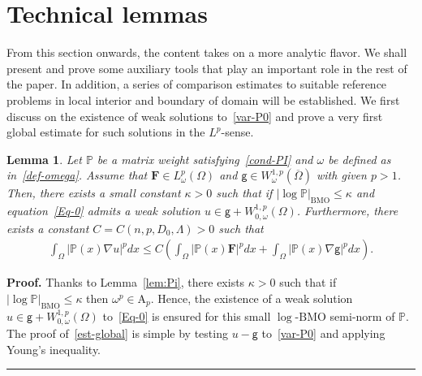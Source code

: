 \documentclass[a4paper, 11pt]{article}
\newtheorem{lemma}[theorem]{Lemma}
\newenvironment{proof}[1][Proof]{\textbf{#1.} }{\hfill\rule{0.5em}{0.5em}}
\begin{document}
\section{Technical lemmas}
\label{sec:lemma}

From this section onwards, the content takes on a more analytic flavor. We shall present and prove some auxiliary tools that play an important role in the rest of the paper. In addition, a series of comparison estimates to suitable reference problems in local interior and boundary of domain will be established. We first discuss on the existence of weak solutions to~\eqref{var-P0} and prove a very first global estimate for such solutions in the $L^p$-sense. 

\begin{lemma}\label{lem:global}
Let $\mathbb{P}$ be a matrix weight satisfying~\eqref{cond-PI} and $\omega$ be defined as in~\eqref{def-omega}. Assume that $\mathbf{F} \in L^{p}_{\omega}(\Omega)$ and $\mathsf{g} \in W^{1,p}_{\omega}(\overline{\Omega})$ with given $p>1$. Then, there exists a small constant $\kappa>0$ such that if $|\log \mathbb{P}|_{\mathrm{BMO}} \le \kappa$ and equation~\eqref{Eq-0} admits a weak solution $u \in \mathsf{g} + W^{1,p}_{0,\omega}(\Omega)$. Furthermore, there exists a constant $C = C(n,p,D_0,\Lambda)>0$ such that
\begin{align}\label{est-global}
\int_{\Omega} |\mathbb{P}(x) \nabla u|^p dx \le C \left( \int_{\Omega} |\mathbb{P}(x) \mathbf{F}|^p dx + \int_{\Omega} |\mathbb{P}(x) \nabla\mathsf{g}|^p dx\right).
\end{align}
\end{lemma}
\begin{proof}
Thanks to Lemma~\ref{lem:Pi}, there exists $\kappa>0$ such that if $|\log \mathbb{P}|_{\mathrm{BMO}} \le \kappa$ then $\omega^p \in \mathrm{A}_{p}$. Hence, the existence of a weak solution $u \in \mathsf{g} + W^{1,p}_{0,\omega}(\Omega)$ to~\eqref{Eq-0} is ensured for this small $\log$-$\mathrm{BMO}$ semi-norm of $\mathbb{P}$. The proof of~\eqref{est-global} is simple by testing $u-\mathsf{g}$ to~\eqref{var-P0} and applying Young's inequality.
\end{proof}
\end{document}
